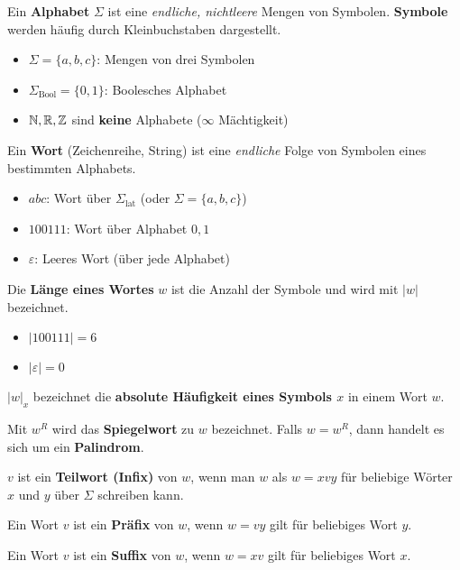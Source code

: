 \label{sec:grundlagen}


Ein \textbf{Alphabet} $\Sigma$ ist eine \emph{endliche, nichtleere} Mengen von Symbolen.
\textbf{Symbole} werden häufig durch Kleinbuchstaben dargestellt.
\begin{itemize}
    \item $\Sigma = \{a, b, c\}$: Mengen von drei Symbolen
    \item $\Sigma_{\text{Bool}} = \{ 0,1 \}$: Boolesches Alphabet
    \item $\mathbb{N}, \mathbb{R}, \mathbb{Z}$ sind \textbf{keine} Alphabete ($\infty$ Mächtigkeit)
\end{itemize}


Ein \textbf{Wort} (Zeichenreihe, String) ist eine \emph{endliche} Folge von Symbolen eines bestimmten Alphabets.
\begin{itemize}
    \item $abc$: Wort über $\Sigma_\text{lat}$ (oder $\Sigma = \{a,b,c\}$)
    \item $100111$: Wort über Alphabet ${0,1}$
    \item $\varepsilon$: Leeres Wort (über jede Alphabet)
\end{itemize}

Die \textbf{Länge eines Wortes} $w$ ist die Anzahl der Symbole und wird mit $|w|$ bezeichnet.
\begin{multicols}{2}
    \begin{itemize}
        \item $|100111| = 6$
        \item $|\varepsilon| = 0$
    \end{itemize}
\end{multicols}

$|w|_x$ bezeichnet die \textbf{absolute Häufigkeit eines Symbols $x$} in einem Wort $w$.

Mit $w^R$ wird das \textbf{Spiegelwort} zu $w$ bezeichnet.
Falls $w = w^R$, dann handelt es sich um ein \textbf{Palindrom}.


$v$ ist ein \textbf{Teilwort (Infix)} von $w$, wenn man $w$ als $w = xvy$ für beliebige Wörter $x$ und $y$ über $\Sigma$ schreiben kann.

Ein Wort $v$ ist ein \textbf{Präfix} von $w$, wenn $w = vy$ gilt für beliebiges Wort $y$.

Ein Wort $v$ ist ein \textbf{Suffix} von $w$, wenn $w = xv$ gilt für beliebiges Wort $x$.

